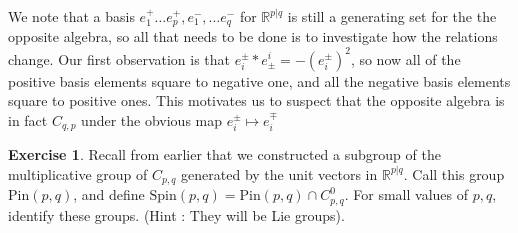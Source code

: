 \documentclass[psamsfonts]{amsart}
\theoremstyle{definition}
\newtheorem{exer}[thm]{Exercise}
\theoremstyle{remark}
\newcommand{\R}{\mathbb{R}}
\newcommand{\Spin}{\mathrm{Spin}}
\newcommand{\Pin}{\mathrm{Pin}}
\begin{document}
We note that a basis $e_1^+ \ldots e_p^+, e_1^- , \ldots e_q^-$ for $\R^{p|q}$ is still a generating set for the the opposite algebra, so all that needs to be done is to investigate how the relations change. Our first observation is that $e_i^\pm * e^i_\pm = -(e_i^\pm)^2$, so now all of the positive basis elements square to negative one, and all the negative basis elements square to positive ones. This motivates us to suspect that the opposite algebra is in fact $C_{q,p}$ under the obvious map $e_i^\pm \mapsto e_i^\mp$
%
\begin{exer}
Recall from earlier that we constructed a subgroup of the multiplicative group of $C_{p,q}$ generated by the unit vectors in $\R^{p|q}$. Call this group $\Pin(p,q)$, and define $\Spin(p,q) = \Pin(p,q) \cap C_{p,q}^0$. For small values of $p,q$, identify these groups. (Hint : They will be Lie groups).
\end{exer}
%
\setcounter{thm}{0}
%
\setcounter{section}{7}
%
\end{document}
